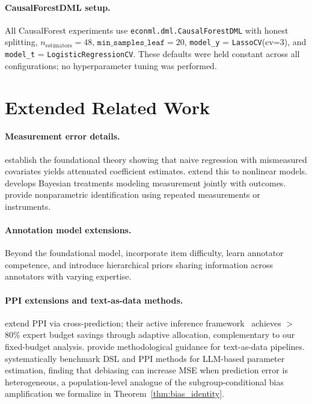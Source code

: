 \paragraph{CausalForestDML setup.}
All CausalForest experiments use \texttt{econml.dml.CausalForestDML} with honest splitting, $n_{\text{estimators}} = 48$, $\texttt{min\_samples\_leaf} = 20$, \texttt{model\_y} = \texttt{LassoCV}(cv=3), and \texttt{model\_t} = \texttt{LogisticRegressionCV}.
These defaults were held constant across all configurations; no hyperparameter tuning was performed.

\section{Extended Related Work}
\label{app:related}

\paragraph{Measurement error details.}
\citet{fuller1987measurement} establish the foundational theory showing that naive regression with mismeasured covariates yields attenuated coefficient estimates.
\citet{carroll2006measurement} extend this to nonlinear models.
\citet{gustafson2003measurement} develops Bayesian treatments modeling measurement jointly with outcomes.
\citet{hu2008nonparametric} provide nonparametric identification using repeated measurements or instruments.

\paragraph{Annotation model extensions.}
Beyond the foundational \citet{dawid1979maximum} model, \citet{passonneau2014benefits} incorporate item difficulty, \citet{hovy2013learning} learn annotator competence, and \citet{paun2018comparing} introduce hierarchical priors sharing information across annotators with varying expertise.

\paragraph{PPI extensions and text-as-data methods.}
\citet{zrnic2024cross} extend PPI via cross-prediction; their active inference framework~\citep{zrnic2024active} achieves $>$80\% expert budget savings through adaptive allocation, complementary to our fixed-budget analysis.
\citet{grimmer2022text} provide methodological guidance for text-as-data pipelines.
\citet{audinet2025benchmarking} systematically benchmark DSL and PPI methods for LLM-based parameter estimation, finding that debiasing can increase MSE when prediction error is heterogeneous, a population-level analogue of the subgroup-conditional bias amplification we formalize in Theorem~\ref{thm:bias_identity}.

